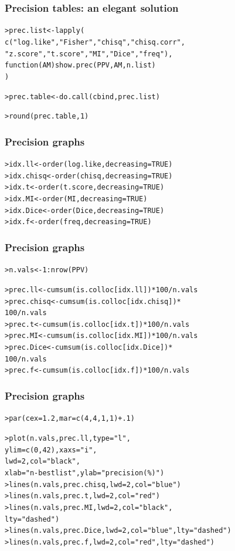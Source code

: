 \documentclass[handout,notes=show,t]{beamer} %
\begin{document}
\begin{frame}[fragile]
  \frametitle{Precision tables: an elegant solution}

  \begin{alltt}
> prec.list <- lapply(
    c("log.like", "Fisher", "chisq", "chisq.corr", 
      "z.score", "t.score", "MI", "Dice", "freq"), 
    function (AM) show.prec(PPV, AM, n.list)
  )

> prec.table <- do.call(cbind, prec.list)


> round(prec.table, 1) 
  \end{alltt}
\end{frame}

\begin{frame}[fragile]
  \frametitle{Precision graphs}

  \begin{alltt}
> idx.ll <- order(log.like, decreasing=TRUE)
> idx.chisq <- order(chisq, decreasing=TRUE)
> idx.t <- order(t.score, decreasing=TRUE)
> idx.MI <- order(MI, decreasing=TRUE)
> idx.Dice <- order(Dice, decreasing=TRUE)
> idx.f <- order(freq, decreasing=TRUE)
 \end{alltt}
\end{frame}

\begin{frame}[fragile]
  \frametitle{Precision graphs}

  \begin{alltt}
> n.vals <- 1:nrow(PPV)

> prec.ll <- cumsum(is.colloc[idx.ll]) * 100 /  n.vals
> prec.chisq <- cumsum(is.colloc[idx.chisq]) *
  100 / n.vals
> prec.t <- cumsum(is.colloc[idx.t]) * 100 / n.vals
> prec.MI <- cumsum(is.colloc[idx.MI]) * 100 / n.vals
> prec.Dice <- cumsum(is.colloc[idx.Dice]) *
  100 / n.vals
> prec.f <- cumsum(is.colloc[idx.f]) * 100 / n.vals
  \end{alltt}
\end{frame}

\begin{frame}[fragile]
  \frametitle{Precision graphs}

  \begin{alltt}
> par(cex=1.2, mar=c(4,4,1,1)+.1)

> plot(n.vals, prec.ll, type="l", 
  ylim=c(0,42), xaxs="i", 
  lwd=2, col="black",     
  xlab="n-best list", ylab="precision (\%)")
> lines(n.vals, prec.chisq, lwd=2, col="blue")
> lines(n.vals, prec.t, lwd=2, col="red")
> lines(n.vals, prec.MI, lwd=2, col="black",
  lty="dashed") 
> lines(n.vals, prec.Dice, lwd=2, col="blue", lty="dashed")
> lines(n.vals, prec.f, lwd=2, col="red", lty="dashed")
  \end{alltt}
\end{frame}
\end{document}
